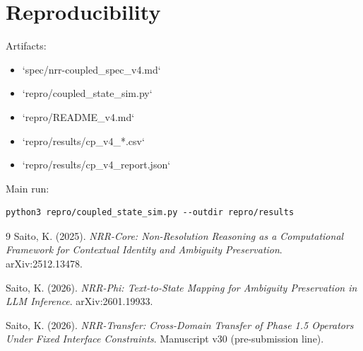 \documentclass[11pt,a4paper]{article}
\begin{document}
\section{Reproducibility}
Artifacts:
\begin{itemize}
  \item `spec/nrr-coupled\_spec\_v4.md`
  \item `repro/coupled\_state\_sim.py`
  \item `repro/README\_v4.md`
  \item `repro/results/cp\_v4\_*.csv`
  \item `repro/results/cp\_v4\_report.json`
\end{itemize}

Main run:
\begin{lstlisting}
python3 repro/coupled_state_sim.py --outdir repro/results
\end{lstlisting}

\begin{thebibliography}{9}
Saito, K. (2025).
\textit{NRR-Core: Non-Resolution Reasoning as a Computational Framework for Contextual Identity and Ambiguity Preservation}.
arXiv:2512.13478.

Saito, K. (2026).
\textit{NRR-Phi: Text-to-State Mapping for Ambiguity Preservation in LLM Inference}.
arXiv:2601.19933.

Saito, K. (2026).
\textit{NRR-Transfer: Cross-Domain Transfer of Phase 1.5 Operators Under Fixed Interface Constraints}.
Manuscript v30 (pre-submission line).
\end{thebibliography}
\end{document}
